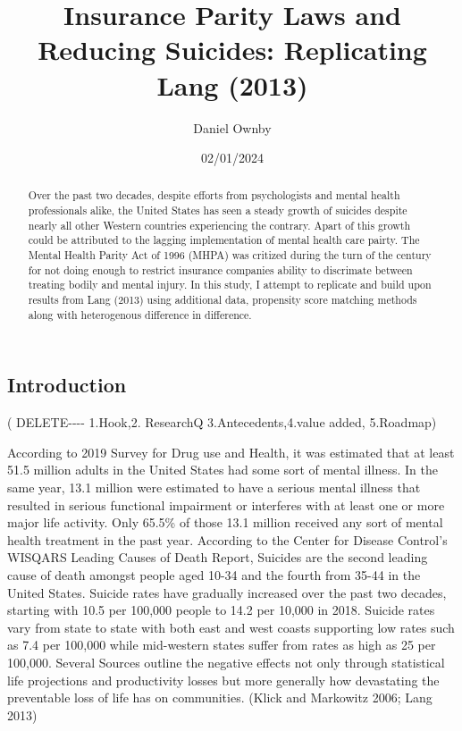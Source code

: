 \documentclass[
  12pt,
]{article}
\title{Insurance Parity Laws and Reducing Suicides: Replicating Lang
(2013)}
\subtitle{Daniel Ownby}
\author{}
\date{\vspace{-2.5em}02/01/2024}
\begin{document}
\maketitle
\begin{abstract}
Over the past two decades, despite efforts from psychologists and mental
health professionals alike, the United States has seen a steady growth
of suicides despite nearly all other Western countries experiencing the
contrary. Apart of this growth could be attributed to the lagging
implementation of mental health care pairty. The Mental Health Parity
Act of 1996 (MHPA) was critized during the turn of the century for not
doing enough to restrict insurance companies ability to discrimate
between treating bodily and mental injury. In this study, I attempt to
replicate and build upon results from Lang (2013) using additional data,
propensity score matching methods along with heterogenous difference in
difference.
\end{abstract}

\newpage

\hypertarget{introduction}{%
\subsection{Introduction}\label{introduction}}

( DELETE-\/-\/-\/- 1.Hook,2. ResearchQ 3.Antecedents,4.value added,
5.Roadmap)

According to 2019 Survey for Drug use and Health, it was estimated that
at least 51.5 million adults in the United States had some sort of
mental illness. In the same year, 13.1 million were estimated to have a
serious mental illness that resulted in serious functional impairment or
interferes with at least one or more major life activity. Only 65.5\% of
those 13.1 million received any sort of mental health treatment in the
past year. According to the Center for Disease Control's WISQARS Leading
Causes of Death Report, Suicides are the second leading cause of death
amongst people aged 10-34 and the fourth from 35-44 in the United
States. Suicide rates have gradually increased over the past two
decades, starting with 10.5 per 100,000 people to 14.2 per 10,000 in
2018. Suicide rates vary from state to state with both east and west
coasts supporting low rates such as 7.4 per 100,000 while mid-western
states suffer from rates as high as 25 per 100,000. Several Sources
outline the negative effects not only through statistical life
projections and productivity losses but more generally how devastating
the preventable loss of life has on communities. (Klick and Markowitz
2006; Lang 2013)
\end{document}
